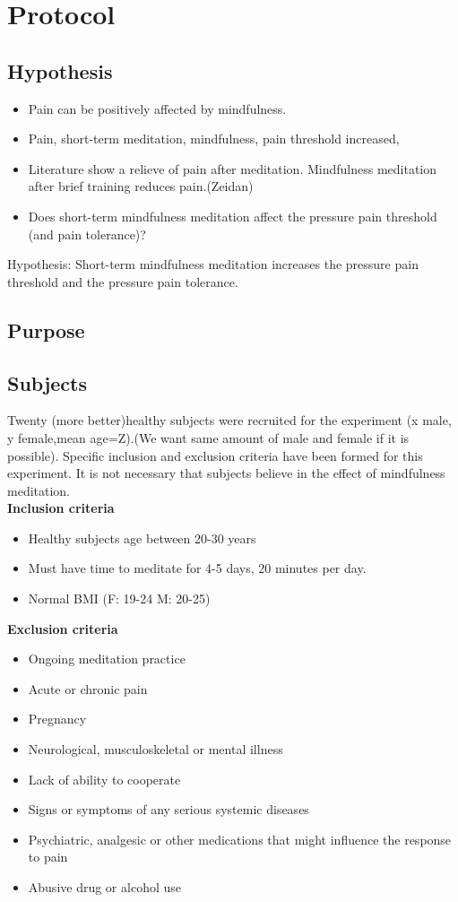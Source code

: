 \section{Protocol}

\subsection{Hypothesis}
\begin{itemize}
	\item Pain can be positively affected by mindfulness.
	\item  Pain, short-term meditation, mindfulness, pain threshold increased,
	\item Literature show a relieve of pain after meditation. Mindfulness meditation after brief training reduces pain.(Zeidan)
	\item Does short-term mindfulness meditation affect the pressure pain threshold (and pain tolerance)?
\end{itemize}

Hypothesis: Short-term mindfulness meditation increases the pressure pain threshold and the pressure pain tolerance.
\subsection{Purpose}
\subsection{Subjects}
Twenty (more better)healthy subjects were recruited for the experiment (x male, y female,mean age=Z).(We want same amount of male and female if it is possible). Specific inclusion and exclusion criteria have been formed for this experiment. It is not necessary that subjects believe in the effect of mindfulness meditation. \\

\textbf{Inclusion criteria}

\begin{itemize}
	\item Healthy subjects age between 20-30 years
	\item Must have time to meditate for 4-5 days, 20 minutes per day.
	\item Normal BMI (F: 19-24 M: 20-25)
\end{itemize}

\textbf{Exclusion criteria}

\begin{itemize}
	\item Ongoing meditation practice 
	\item Acute or chronic pain
	\item Pregnancy
	\item Neurological, musculoskeletal or mental illness
	\item Lack of ability to cooperate
	\item Signs or symptoms of any serious systemic diseases 
	\item Psychiatric, analgesic or other medications that might influence the response to pain 
	\item Abusive drug or alcohol use
	
\end{itemize}
